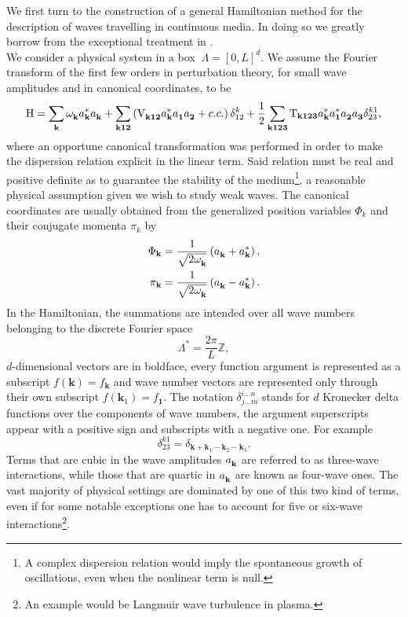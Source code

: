 We first turn to the construction of a general Hamiltonian method for the description of waves travelling in continuous media. In doing so
we greatly borrow from the exceptional treatment in \cite{Zakharov}. \\
We consider a physical system in a box $\ \Lambda = [0,L]^d$. We assume the Fourier transform of the first few orders in 
perturbation theory, for small wave amplitudes and in canonical coordinates, to be
\begin{equation}
    \mathrm{H} = \sum_\mathbf{k} \omega^{}_\mathbf{k} a_\mathbf{k}^{*} a_\mathbf{k}^{} + \sum_{\mathbf{k12}} \left( \mathrm{V}_{\mathbf{k12}}^{} a_\mathbf{k}^{*}a_\mathbf{1}^{}a_\mathbf{2}^{} + c.c.  \right)\delta^{k}_{12} \\
    +\frac{1}{2}\sum_{\mathbf{k123}} \mathrm{T}_{\mathbf{k123}} a_\mathbf{k}^{*}a_\mathbf{1}^{*}a_\mathbf{2}^{}a_\mathbf{3}^{}\delta^{k1}_{23},
    \label{HamOrig}
\end{equation}
where an opportune canonical transformation was performed in order to make the dispersion relation explicit in the linear term. Said relation must be real and positive definite 
as to guarantee the stability of the medium\footnote{A complex dispersion relation would imply the spontaneous growth of oscillations, even when the nonlinear
term is null.}, a reasonable physical assumption given we wish to study weak waves. The canonical coordinates are usually obtained from the generalized position
variables $\Phi_k$ and their conjugate momenta $\pi_k$ by
\begin{align*}
    \Phi_\mathbf{k} &= \frac{1}{\sqrt{2\omega^{}_{\mathbf{k}}}}\left(a_\mathbf{k}^{} + a_\mathbf{k}^{*}\right) , \\
    \pi_\mathbf{k} &= \frac{1}{\sqrt{2\omega^{}_{\mathbf{k}}}}\left(a_\mathbf{k}^{} - a_\mathbf{k}^{*} \right) .
\end{align*}
In the Hamiltonian, the summations are intended over all wave numbers belonging to the discrete Fourier space 
\begin{equation}
    \Lambda^* = \frac{2\pi}{L}\mathbb{Z},
\end{equation}
$d$-dimensional vectors are in boldface, every function argument is represented as a subscript $f(\mathbf{k})=f_\mathbf{k}$ and wave number vectors are 
represented only through their own subscript $f(\mathbf{k}_1)=f_\mathbf{1}$. The notation $\delta^{i\dots n}_{j \dots m}$ stands for $d$ Kronecker delta functions over the components of 
wave numbers, 
the argument superscripts appear with a positive sign and subscripts with a negative one. For example 
\begin{equation}
    \delta^{k1}_{23} = \delta_{\mathbf{k} + \mathbf{k}_1 - 
    \mathbf{k}_2 - \mathbf{k}_3}.
\end{equation}
Terms that are cubic in the wave amplitudes $a_\mathbf{k}^{}$ are referred to as three-wave interactions, while those that are quartic in $a_\mathbf{k}^{}$ are known as four-wave ones. The vast majority of physical 
settings are dominated by one of this two kind of terms, even if for some notable exceptions one has to account for five or six-wave interactions\footnote{An example would be
Langmuir wave turbulence in plasma.}. \\

